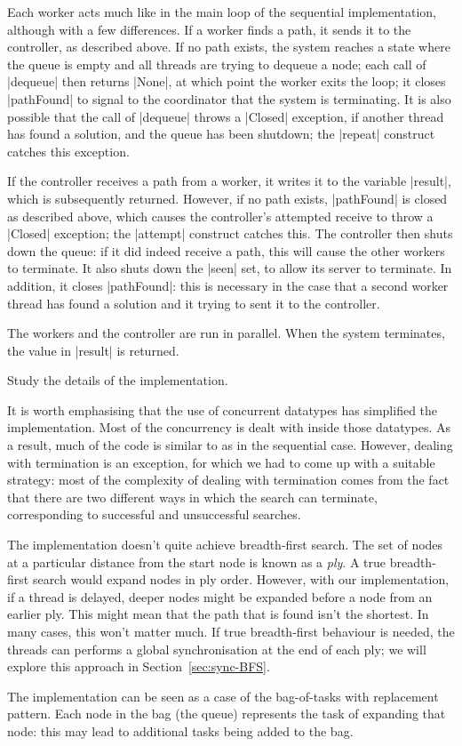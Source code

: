 
Each worker acts much like in the main loop of the sequential implementation,
although with a few differences.  If a worker finds a path, it sends it to the
controller, as described above.  If no path exists, the system reaches a state
where the queue is empty and all threads are trying to dequeue a node; each
call of |dequeue| then returns |None|, at which point the worker exits the
loop; it closes |pathFound| to signal to the coordinator that the system is
terminating.  It is also possible that the call of |dequeue| throws a |Closed|
exception, if another thread has found a solution, and the queue has been
shutdown; the |repeat| construct catches this exception.

If the controller receives a path from a worker, it writes it to the variable
|result|, which is subsequently returned.  However, if no path exists,
|pathFound| is closed as described above, which causes the controller's
attempted receive to throw a |Closed| exception; the |attempt| construct
catches this.  The controller then shuts down the queue: if it did indeed
receive a path, this will cause the other workers to terminate.  It also shuts
down the |seen| set, to allow its server to terminate.  In addition, it closes
|pathFound|: this is necessary in the case that a second worker thread has
found a solution and it trying to sent it to the controller.

The workers and the controller are run in parallel.  When the system
terminates, the value in |result| is returned.

\begin{instruction}
Study the details of the implementation.
\end{instruction}

It is worth emphasising that the use of concurrent datatypes has simplified
the implementation.  Most of the concurrency is dealt with inside those
datatypes.  As a result, much of the code is similar to as in the sequential
case.  However, dealing with termination is an exception, for which we had to
come up with a suitable strategy: most of the complexity of dealing with
termination comes from the fact that there are two different ways
in which the search can terminate, corresponding to successful and
unsuccessful searches. 

The implementation doesn't quite achieve breadth-first search.  The set of
nodes at a particular distance from the start node is known as a \emph{ply}.
A true breadth-first search would expand nodes in ply order.  However, with
our implementation, if a thread is delayed, deeper nodes might be expanded
before a node from an earlier ply.  This might mean that the path that is
found isn't the shortest.  In many cases, this won't matter much.  If true
breadth-first behaviour is needed, the threads can performs a global
synchronisation at the end of each ply; we will explore this approach in
Section~\ref{sec:sync-BFS}.

The implementation can be seen as a case of the bag-of-tasks with replacement
pattern.  Each node in the bag (the queue) represents the task of expanding
that node: this may lead to additional tasks being added to the bag.

